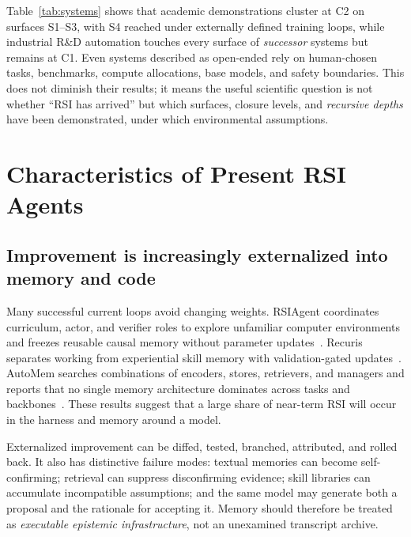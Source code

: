 \documentclass[11pt,a4paper]{article}
\begin{document}
Table~\ref{tab:systems} shows that academic demonstrations cluster at C2 on surfaces S1--S3, with S4 reached under externally defined training loops, while industrial R\&D automation touches every surface of \emph{successor} systems but remains at C1. Even systems described as open-ended rely on human-chosen tasks, benchmarks, compute allocations, base models, and safety boundaries. This does not diminish their results; it means the useful scientific question is not whether ``RSI has arrived'' but which surfaces, closure levels, and \emph{recursive depths} have been demonstrated, under which environmental assumptions.

\section{Characteristics of Present RSI Agents}\label{sec:chars}
\subsection{Improvement is increasingly externalized into memory and code}
Many successful current loops avoid changing weights. RSIAgent coordinates curriculum, actor, and verifier roles to explore unfamiliar computer environments and freezes reusable causal memory without parameter updates~\cite{zhu2026rsiagent}. Recuris separates working from experiential skill memory with validation-gated updates~\cite{yu2026recuris}. AutoMem searches combinations of encoders, stores, retrievers, and managers and reports that no single memory architecture dominates across tasks and backbones~\cite{du2026automem}. These results suggest that a large share of near-term RSI will occur in the harness and memory around a model.

Externalized improvement can be diffed, tested, branched, attributed, and rolled back. It also has distinctive failure modes: textual memories can become self-confirming; retrieval can suppress disconfirming evidence; skill libraries can accumulate incompatible assumptions; and the same model may generate both a proposal and the rationale for accepting it. Memory should therefore be treated as \emph{executable epistemic infrastructure}, not an unexamined transcript archive.
\end{document}
